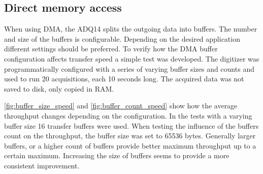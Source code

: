 \subsection{Direct memory access}

When using DMA, the ADQ14 splits the outgoing data into buffers.
The number and size of the buffers is configurable. Depending
on the desired application different settings should be preferred. 
To verify how the DMA buffer configuration affects transfer speed a simple
test was developed. The digitizer was programmatically configured with 
a series of varying buffer sizes and counts and used to run 20 
acquisitions, each 10 seconds long. The acquired data was not 
saved to disk, only copied in RAM.

\autoref{fig:buffer_size_speed} and \autoref{fig:buffer_count_speed}
show how the average throughput changes depending on the
configuration. In the tests with a varying buffer size 16 transfer buffers were used.
When testing the influence of the buffers count on the throughput,
the buffer size was set to 65536 bytes.
Generally larger buffers, or a higher count of buffers
provide better maximum throughput up to a certain maximum.
Increasing the size of buffers seems to provide a more consistent improvement. 
